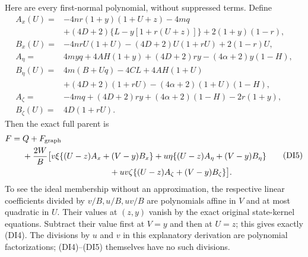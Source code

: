 Here are every first-normal polynomial, without suppressed terms.
Define
\[
\begin{split}
 A_x(U)={}&-4nr(1+y)(1+U+z)-4mq\\
 &+(4D+2)\{L-y[1+r(U+z)]\}+2(1+y)(1-r),\\
 B_x(U)={}&-4nrU(1+U)-(4D+2)U(1+rU)+2(1-r)U,\\
 A_\eta={}&4myq+4AH(1+y)+(4D+2)ry-(4\alpha+2)y(1-H),\\
 B_\eta(U)={}&4m(B+Uq)-4CL+4AH(1+U)\\
 &+(4D+2)(1+rU)-(4\alpha+2)(1+U)(1-H),\\
 A_\zeta={}&-4mq+(4D+2)ry+(4\alpha+2)(1-H)-2r(1+y),\\
 B_\zeta(U)={}&4D(1+rU).
\end{split}                                                    \tag{DI4}
\]
Then the exact full parent is
\[
\begin{split}
 F={}&Q+F_{\rm graph}\\
 &+\frac{2W}{B}\bigl[
 v\xi\{(U-z)A_x+(V-y)B_x\}
 +u\eta\{(U-z)A_\eta+(V-y)B_\eta\}\\
 &\hspace{37mm}+uv\zeta\{(U-z)A_\zeta+(V-y)B_\zeta\}\bigr].
                                                               \end{split} \tag{DI5}
\]
To see the ideal membership without an approximation, the respective
linear coefficients divided by $v/B,u/B,uv/B$ are polynomials affine
in $V$ and at most quadratic in $U$.  Their values at $(z,y)$ vanish
by the exact original state-kernel equations.  Subtract their value
first at $V=y$ and then at $U=z$; this gives exactly (DI4).  The
divisions by $u$ and $v$ in this explanatory derivation are polynomial
factorizations; (DI4)--(DI5) themselves have no such divisions.

